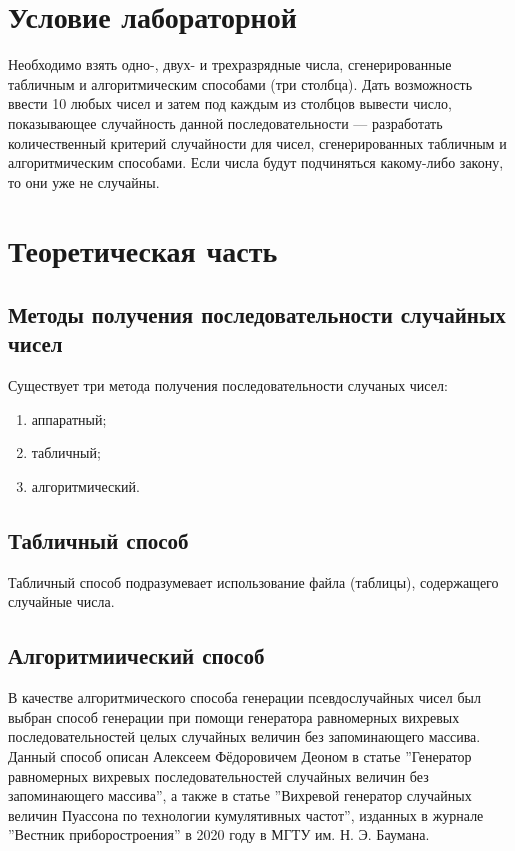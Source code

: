 \chapter{Условие лабораторной}

Необходимо взять одно-, двух- и трехразрядные числа, сгенерированные табличным и алгоритмическим способами (три столбца). Дать возможность
ввести 10 любых чисел и затем под каждым из столбцов вывести число, показывающее случайность данной последовательности — разработать количественный критерий случайности для чисел, сгенерированных табличным и алгоритмическим способами. Если числа будут подчиняться какому-либо закону, то они уже не случайны.

\chapter{Теоретическая часть}

\section{Методы получения последовательности случайных чисел}

Существует три метода получения последовательности случаных чисел:
\begin{enumerate}
	\item аппаратный;
	\item табличный;
	\item алгоритмический. 
\end{enumerate}

\section{Табличный способ}

Табличный способ подразумевает использование файла (таблицы), содержащего случайные числа.

\section{Алгоритмиический способ}

В качестве алгоритмического способа генерации псевдослучайных чисел был выбран способ генерации при помощи генератора равномерных вихревых последовательностей целых случайных величин без запоминающего массива.
Данный способ описан Алексеем Фёдоровичем Деоном в статье ''Генератор равномерных вихревых последовательностей случайных величин без запоминающего массива'', а также в статье ''Вихревой генератор случайных величин Пуассона  по технологии кумулятивных частот'', изданных в журнале ''Вестник приборостроения'' в 2020 году в МГТУ им. Н. Э. Баумана.


